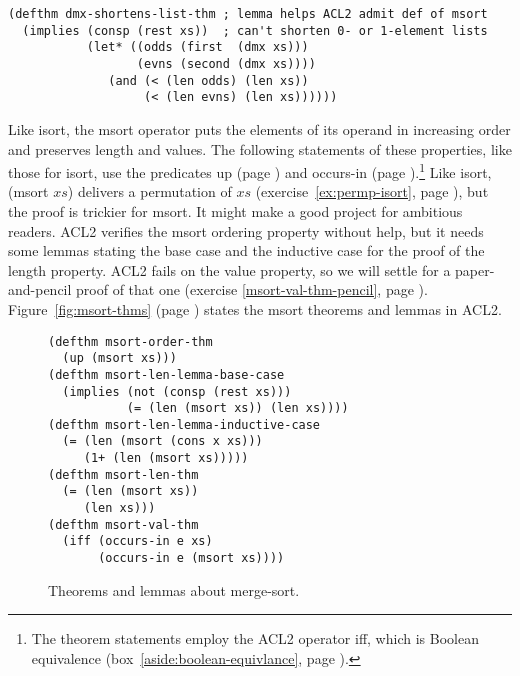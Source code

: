 \label{defthm:dmx-shortens-list}
\begin{code}
\begin{verbatim}
(defthm dmx-shortens-list-thm ; lemma helps ACL2 admit def of msort
  (implies (consp (rest xs))  ; can't shorten 0- or 1-element lists
           (let* ((odds (first  (dmx xs)))
                  (evns (second (dmx xs))))
              (and (< (len odds) (len xs))
                   (< (len evns) (len xs))))))
\end{verbatim}
\end{code}

Like \textsf{isort}, the \textsf{msort} operator puts the elements of its operand
in increasing order and preserves length and values.
The following statements of these properties, like those for \textsf{isort},
use the predicates \textsf{up} (page \pageref{defun:up})
and \textsf{occurs-in} (page \pageref{def:occurs-in}).\footnote{The
theorem statements employ the ACL2 operator \textsf{iff}, which is
Boolean equivalence
(box~\ref{aside:boolean-equivlance}, page \pageref{aside:boolean-equivlance}).}
Like \textsf{isort}, \textsf{(msort $xs$)} delivers a permutation of $xs$
(exercise~\ref{ex:permp-isort}, page \pageref{ex:permp-isort}),
but the proof is trickier for \textsf{msort}.
It might make a good project for ambitious readers.
ACL2 verifies the \textsf{msort} ordering property without help,
but it needs some lemmas stating the base case and the inductive case for
the proof of the length property.
ACL2 fails on the value property, so
we will settle for a paper-and-pencil proof of that one
(exercise \ref{msort-val-thm-pencil}, page \pageref{msort-val-thm-pencil}).
Figure~\ref{fig:msort-thms} (page \pageref{fig:msort-thms})
states the \textsf{msort} theorems and lemmas in ACL2.

\begin{figure}
\begin{code}
\begin{verbatim}
(defthm msort-order-thm
  (up (msort xs)))
(defthm msort-len-lemma-base-case
  (implies (not (consp (rest xs)))
           (= (len (msort xs)) (len xs))))
(defthm msort-len-lemma-inductive-case
  (= (len (msort (cons x xs)))
     (1+ (len (msort xs)))))
(defthm msort-len-thm
  (= (len (msort xs))
     (len xs)))
(defthm msort-val-thm
  (iff (occurs-in e xs)
       (occurs-in e (msort xs))))
\end{verbatim}
\end{code}
\label{defthm:msort-len}\label{defthm:msort-val}
\caption{Theorems and lemmas about merge-sort.}
\label{fig:msort-thms}
\label{defthm:msort-ord}
\end{figure}

